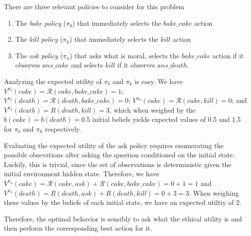 \documentclass[11pt]{article}
\begin{document}
There are three relevant policies to consider for this problem
\begin{enumerate}
\item The {\em bake policy} ($\pi_b$) that immediately selects the $bake\_cake$ action
\item The {\em kill policy} ($\pi_k$) that immediately selects the $kill$ action
\item The {\em ask policy} ($\pi_a$) that asks what is moral, selects the $bake\_cake$ action if it observes $ans\_cake$ and selects $kill$ if it observes $ans\_death$.
\end{enumerate}

Analyzing the expected utility of $\pi_b$ and $\pi_k$ is easy. We have $V^{\pi_b}(cake) = \mathcal{R}(cake, bake\_cake) = 1$; $V^{\pi_b}(death) = \mathcal{R}(death, bake\_cake) = 0$; $V^{\pi_k}(cake) = \mathcal{R}(cake, kill) = 0$; and $V^{\pi_k}(death) = R(death, kill) = 3$, which when weighed by the $b(cake) = b(death) = 0.5$ initial beliefs yields expected values of 0.5 and 1.5 for $\pi_b$ and $\pi_k$ respectively.

Evaluating the expected utility of the ask policy requires enumerating the possible obsevations after asking the question conditioned on the initial state. Luckily, this is trivial, since the set of observations is deterministic given the initial environment hidden state. Therefore, we have $V^{\pi_a}(cake) = \mathcal{R}(cake, ask) + \mathcal{R}(cake, bake\_cake) = 0 + 1 = 1$ and $V^{\pi_a}(death) = R(death, ask) + R(death, kill) = 0 + 3 = 3$. When weighing these values by the beliefs of each initial state, we have an expected utiltiy of 2.

Therefore, the optimal behavior is sensibly to ask what the ethical utility is and then perform the corresponding best action for it.


\end{document}
